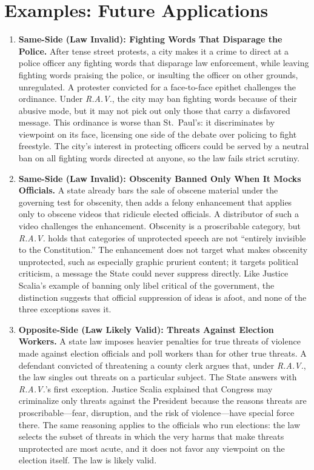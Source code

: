 \documentclass[12pt]{article}
\begin{document}
\section{Examples: Future Applications}
\begin{enumerate}

\item \textbf{Same-Side (Law Invalid): Fighting Words That Disparage the Police.} After tense street protests, a city makes it a crime to direct at a police officer any fighting words that disparage law enforcement, while leaving fighting words praising the police, or insulting the officer on other grounds, unregulated. A protester convicted for a face-to-face epithet challenges the ordinance. Under \textit{R.A.V.}, the city may ban fighting words because of their abusive mode, but it may not pick out only those that carry a disfavored message. This ordinance is worse than St.~Paul's: it discriminates by viewpoint on its face, licensing one side of the debate over policing to fight freestyle. The city's interest in protecting officers could be served by a neutral ban on all fighting words directed at anyone, so the law fails strict scrutiny.

\item \textbf{Same-Side (Law Invalid): Obscenity Banned Only When It Mocks Officials.} A state already bars the sale of obscene material under the governing test for obscenity, then adds a felony enhancement that applies only to obscene videos that ridicule elected officials. A distributor of such a video challenges the enhancement. Obscenity is a proscribable category, but \textit{R.A.V.} holds that categories of unprotected speech are not ``entirely invisible to the Constitution.'' The enhancement does not target what makes obscenity unprotected, such as especially graphic prurient content; it targets political criticism, a message the State could never suppress directly. Like Justice Scalia's example of banning only libel critical of the government, the distinction suggests that official suppression of ideas is afoot, and none of the three exceptions saves it.

\item \textbf{Opposite-Side (Law Likely Valid): Threats Against Election Workers.} A state law imposes heavier penalties for true threats of violence made against election officials and poll workers than for other true threats. A defendant convicted of threatening a county clerk argues that, under \textit{R.A.V.}, the law singles out threats on a particular subject. The State answers with \textit{R.A.V.}'s first exception. Justice Scalia explained that Congress may criminalize only threats against the President because the reasons threats are proscribable---fear, disruption, and the risk of violence---have special force there. The same reasoning applies to the officials who run elections: the law selects the subset of threats in which the very harms that make threats unprotected are most acute, and it does not favor any viewpoint on the election itself. The law is likely valid.


\end{enumerate}
\end{document}
